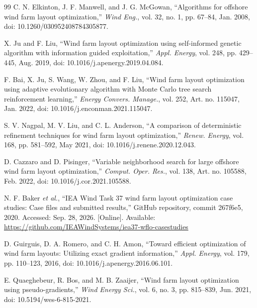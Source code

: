 {\begin{thebibliography}{99}
C. N. Elkinton, J. F. Manwell, and J. G. McGowan, ``Algorithms for offshore wind farm layout optimization,'' \textit{Wind Eng.}, vol. 32, no. 1, pp. 67--84, Jan. 2008, doi: 10.1260/030952408784305877.

X. Ju and F. Liu, ``Wind farm layout optimization using self-informed genetic algorithm with information guided exploitation,'' \textit{Appl. Energy}, vol. 248, pp. 429--445, Aug. 2019, doi: 10.1016/j.apenergy.2019.04.084.

F. Bai, X. Ju, S. Wang, W. Zhou, and F. Liu, ``Wind farm layout optimization using adaptive evolutionary algorithm with Monte Carlo tree search reinforcement learning,'' \textit{Energy Convers. Manage.}, vol. 252, Art. no. 115047, Jan. 2022, doi: 10.1016/j.enconman.2021.115047.

S. V. Nagpal, M. V. Liu, and C. L. Anderson, ``A comparison of deterministic refinement techniques for wind farm layout optimization,'' \textit{Renew. Energy}, vol. 168, pp. 581--592, May 2021, doi: 10.1016/j.renene.2020.12.043.

D. Cazzaro and D. Pisinger, ``Variable neighborhood search for large offshore wind farm layout optimization,'' \textit{Comput. Oper. Res.}, vol. 138, Art. no. 105588, Feb. 2022, doi: 10.1016/j.cor.2021.105588.

N. F. Baker \textit{et al.}, ``IEA Wind Task 37 wind farm layout optimization case studies: Case files and submitted results,'' GitHub repository, commit 267f6e5, 2020. Accessed: Sep. 28, 2026. [Online]. Available: \url{https://github.com/IEAWindSystems/iea37-wflo-casestudies}

D. Guirguis, D. A. Romero, and C. H. Amon, ``Toward efficient optimization of wind farm layouts: Utilizing exact gradient information,'' \textit{Appl. Energy}, vol. 179, pp. 110--123, 2016, doi: 10.1016/j.apenergy.2016.06.101.

E. Quaeghebeur, R. Bos, and M. B. Zaaijer, ``Wind farm layout optimization using pseudo-gradients,'' \textit{Wind Energy Sci.}, vol. 6, no. 3, pp. 815--839, Jun. 2021, doi: 10.5194/wes-6-815-2021.


\end{thebibliography}}
